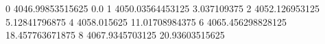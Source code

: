 0 4046.99853515625 0.0
1 4050.03564453125 3.037109375
2 4052.126953125 5.12841796875
4 4058.015625 11.01708984375
6 4065.456298828125 18.457763671875
8 4067.9345703125 20.93603515625
